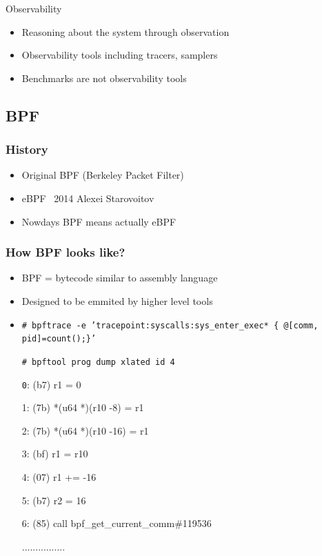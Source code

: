 \documentclass{beamer}
\begin{document}
\begin{frame}
  \begin{block}{Observability}
		\begin{Large}
			\begin{itemize}
				\item<+-> Reasoning about the system through observation
				\item<+-> Observability tools including tracers, samplers
				\item<+-> Benchmarks are not observability tools
			\end{itemize}
		\end{Large}
  \end{block} 
\end{frame}


\subsection{BPF} %

\begin{frame}
\frametitle{History}
		\begin{Large}
			\begin{itemize}
				\item<1-> Original BPF (Berkeley Packet Filter)
				\item<2-> eBPF ~2014 Alexei Starovoitov
				\item<3-> Nowdays BPF means actually eBPF
			\end{itemize}
		\end{Large}
\end{frame}

\begin{frame}
  \frametitle{How BPF looks like?}
  \begin{itemize}
    \item<1-> BPF =  bytecode similar to assembly language
    \item<2-> Designed to be emmited by higher level tools
    \item<3-> {\scriptsize \texttt{\# bpftrace -e 'tracepoint:syscalls:sys\_enter\_exec* \{ @[comm, pid]=count();\}' }}
		\begin{block}{\scriptsize \texttt{\# bpftool prog dump xlated id 4}}
      {\texttt 
			 0: (b7) r1 = 0

			 1: (7b) *(u64 *)(r10 -8) = r1

			 2: (7b) *(u64 *)(r10 -16) = r1

			 3: (bf) r1 = r10

			 4: (07) r1 += -16

			 5: (b7) r2 = 16

			 6: (85) call bpf\_get\_current\_comm\#119536
			 
			 ................
		  }
      \end{block}
  \end{itemize}
\end{frame}
\end{document}
